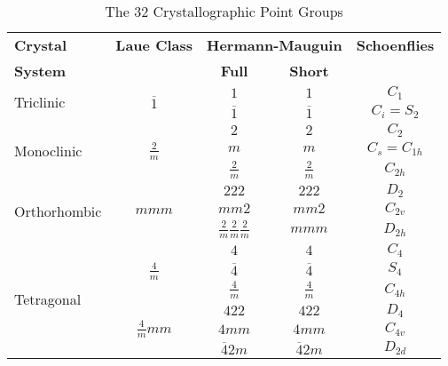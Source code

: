 \documentclass[12pt]{article}
\begin{document}
\begin{table}[h]
\caption{The 32 Crystallographic Point Groups}
\centering
\small
  \begin{tabular}{lcccc}
    \hline
	\textbf{Crystal}           & \textbf{Laue Class}             & \multicolumn{2}{l}{\textbf{Hermann-Mauguin}} & \textbf{Schoenflies}\\
   	\textbf{System}            &                                 & \textbf{Full} & \textbf{Short }              & \\
   	\hline
   	\hline
   	\multirow{2}{*}{Triclinic} & \multirow{2}{*}{$\overline{1}$} & $1$ & $1$ & $C_1$\\
                               &                                 & $\overline{1}$ & $\overline{1}$ & $C_i = S_2$ \\
    \hline
    \multirow{3}{*}{Monoclinic} & \multirow{3}{*}{$\displaystyle \frac{2}{m}$} & $2$ & $2$ & $C_2$\\
                               &                                 & $m$ & $m$ & $C_s = C_{1h}$ \\
                               &                                 & $\displaystyle \frac{2}{m}$ & $\displaystyle \frac{2}{m}$ & $C_{2h}$ \\[1.5ex]
    \hline
    \multirow{3}{*}{Orthorhombic} & \multirow{3}{*}{$mmm$} & $222$ & $222$ & $D_2$\\
                               &                           & $mm2$ & $mm2$ & $C_{2v}$ \\
                               &                           & $\displaystyle \frac{2}{m}\frac{2}{m}\frac{2}{m}$ & $mmm$ & $D_{2h}$ \\[1.5ex]
    \hline
    \multirow{7}{*}{Tetragonal} & \multirow{3}{*}{$\displaystyle \frac{4}{m}$} & $4$ & $4$ & $C_4$\\
                               &                                 & $\overline{4}$ & $\overline{4}$ & $S_4$ \\
                               &                                 & $\displaystyle \frac{4}{m}$ & $\displaystyle \frac{4}{m}$ & $C_{4h}$ \\[1.5ex]
                               \cline{2-5}
							  & \multirow{4}{*}{$\displaystyle \frac{4}{m}mm$} & $422$ & $422$ & $D_4$\\
                               &                                 & $4mm$ & $4mm$ & $C_{4v}$ \\
                               &                                 & $\overline{4}2m$ & $\overline{4}2m$ & $D_{2d}$ \\

\end{tabular}
\end{table}
\end{document}
